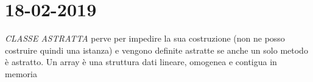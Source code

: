 

\newpage
\section{18-02-2019}
\par


\textit{CLASSE ASTRATTA} perve per impedire la sua costruzione (non ne posso costruire quindi una istanza) e vengono definite astratte se  anche un solo metodo è astratto. \newline
Un array è una struttura dati lineare, omogenea e contigua in memoria






